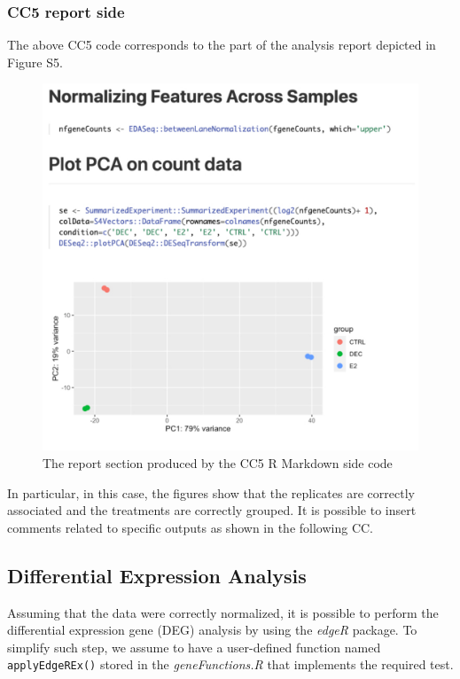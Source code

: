 \documentclass[
]{article}
\begin{document}
\newpage

\hypertarget{cc5-report-side}{%
\subsubsection{CC5 report side}\label{cc5-report-side}}

The above CC5 code corresponds to the part of the analysis report
depicted in Figure S5.

\begin{figure}[ht]

{\centering \includegraphics[width=0.9\linewidth]{imgs/5} 

}

\caption{The report section produced by the CC5 R Markdown side code}\label{fig:unnamed-chunk-12}
\end{figure}

In particular, in this case, the figures show that the replicates are
correctly associated and the treatments are correctly grouped. It is
possible to insert comments related to specific outputs as shown in the
following CC.

\hypertarget{differential-expression-analysis}{%
\subsection{Differential Expression
Analysis}\label{differential-expression-analysis}}

Assuming that the data were correctly normalized, it is possible to
perform the differential expression gene (DEG) analysis by using the
\emph{edgeR} package. To simplify such step, we assume to have a
user-defined function named \texttt{applyEdgeREx()} stored in the
\emph{geneFunctions.R} that implements the required test.
\end{document}

